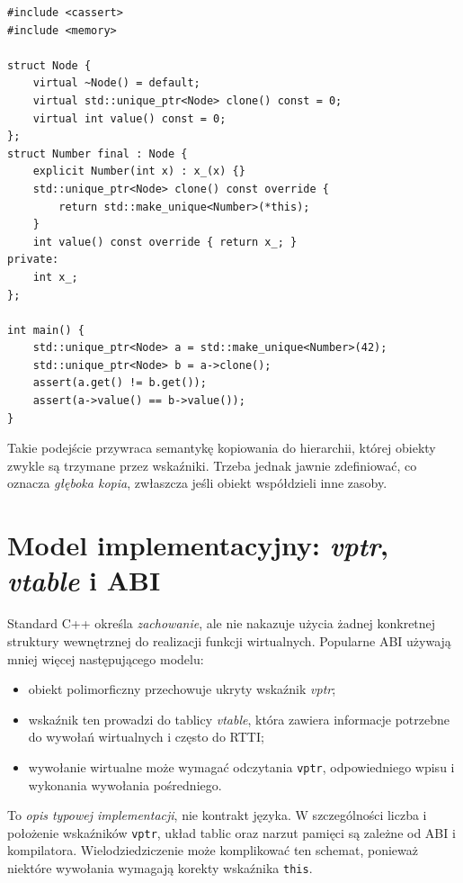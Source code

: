 \begin{lstlisting}[caption={Kopiowanie polimorficzne (C++14); kompletny program.}]
#include <cassert>
#include <memory>

struct Node {
    virtual ~Node() = default;
    virtual std::unique_ptr<Node> clone() const = 0;
    virtual int value() const = 0;
};
struct Number final : Node {
    explicit Number(int x) : x_(x) {}
    std::unique_ptr<Node> clone() const override {
        return std::make_unique<Number>(*this);
    }
    int value() const override { return x_; }
private:
    int x_;
};

int main() {
    std::unique_ptr<Node> a = std::make_unique<Number>(42);
    std::unique_ptr<Node> b = a->clone();
    assert(a.get() != b.get());
    assert(a->value() == b->value());
}
\end{lstlisting}

Takie podejście przywraca semantykę kopiowania do hierarchii,
której obiekty zwykle są trzymane przez wskaźniki.
Trzeba jednak jawnie zdefiniować, co oznacza \emph{głęboka kopia},
zwłaszcza jeśli obiekt współdzieli inne zasoby.

\section{Model implementacyjny: \emph{vptr}, \emph{vtable} i ABI}
\label{sec:cpp12-vtable}

Standard C++ określa \emph{zachowanie}, ale nie nakazuje użycia
żadnej konkretnej struktury wewnętrznej do realizacji funkcji
wirtualnych. Popularne ABI używają mniej więcej następującego modelu:
\begin{itemize}
\item obiekt polimorficzny przechowuje ukryty wskaźnik \emph{vptr};
\item wskaźnik ten prowadzi do tablicy \emph{vtable}, która zawiera
  informacje potrzebne do wywołań wirtualnych i często do RTTI;
\item wywołanie wirtualne może wymagać odczytania \texttt{vptr},
  odpowiedniego wpisu i wykonania wywołania pośredniego.
\end{itemize}

To \emph{opis typowej implementacji}, nie kontrakt języka.
W szczególności liczba i położenie wskaźników \texttt{vptr},
układ tablic oraz narzut pamięci są zależne od ABI i kompilatora.
Wielodziedziczenie może komplikować ten schemat, ponieważ niektóre
wywołania wymagają korekty wskaźnika \texttt{this}.


